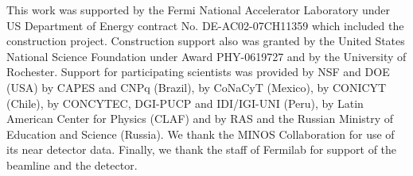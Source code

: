 \begin{acknowledgments}

This work was supported by the Fermi National Accelerator Laboratory
under US Department of Energy contract
No. DE-AC02-07CH11359 which included the \minerva construction project.
Construction support also
was granted by the United States National Science Foundation under
Award PHY-0619727 and by the University of Rochester. Support for
participating scientists was provided by NSF and DOE (USA) by CAPES
and CNPq (Brazil), by CoNaCyT (Mexico), by CONICYT (Chile), by
CONCYTEC, DGI-PUCP and IDI/IGI-UNI (Peru), by Latin American Center for
Physics (CLAF) and by RAS and the Russian Ministry of Education and Science (Russia).  We
thank the MINOS Collaboration for use of its
near detector data. Finally, we thank the staff of
Fermilab for support of the beamline and the detector.

\end{acknowledgments}
